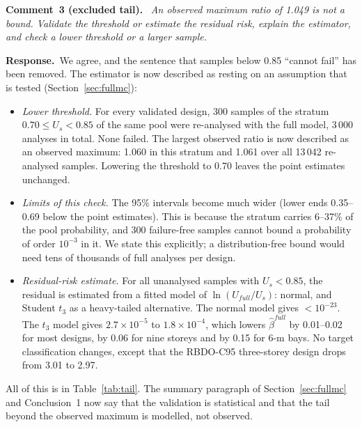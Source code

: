 \documentclass[11pt]{article}
\newenvironment{comment}[1]{\par\medskip\noindent\textbf{Comment~#1.}\ \itshape}{\par}
\newcommand{\resp}{\par\noindent\textbf{Response.}\ }
\begin{document}
\begin{comment}{3 (excluded tail)}
An observed maximum ratio of 1.049 is not a bound. Validate the threshold or estimate the residual
risk, explain the estimator, and check a lower threshold or a larger sample.
\end{comment}
\resp We agree, and the sentence that samples below 0.85 ``cannot fail'' has been removed. The
estimator is now described as resting on an assumption that is tested (Section~\ref{sec:fullmc}):
\begin{itemize}[itemsep=0.1em]
\item \emph{Lower threshold.} For every validated design, 300 samples of the stratum $0.70\le
U_s<0.85$ of the same pool were re-analysed with the full model, 3\,000 analyses in total. None
failed. The largest observed ratio is now described as an observed maximum: 1.060 in this stratum
and 1.061 over all 13\,042 re-analysed samples. Lowering the threshold to 0.70 leaves the point
estimates unchanged.
\item \emph{Limits of this check.} The 95\% intervals become much wider (lower ends 0.35--0.69
below the point estimates). This is because the stratum carries 6--37\% of the pool probability, and
300 failure-free samples cannot bound a probability of order $10^{-3}$ in it. We state this
explicitly; a distribution-free bound would need tens of thousands of full analyses per design.
\item \emph{Residual-risk estimate.} For all unanalysed samples with $U_s<0.85$, the residual is
estimated from a fitted model of $\ln(U_{full}/U_s)$: normal, and Student $t_3$ as a heavy-tailed
alternative. The normal model gives $<10^{-23}$. The $t_3$ model gives $2.7\times10^{-5}$ to
$1.8\times10^{-4}$, which lowers $\hat\beta^{full}$ by 0.01--0.02 for most designs, by 0.06 for nine
storeys and by 0.15 for 6-m bays. No target classification changes, except that the RBDO-C95
three-storey design drops from 3.01 to 2.97.
\end{itemize}
All of this is in Table~\ref{tab:tail}. The summary paragraph of Section~\ref{sec:fullmc} and
Conclusion~1 now say that the validation is statistical and that the tail beyond the observed
maximum is modelled, not observed.
\end{document}
